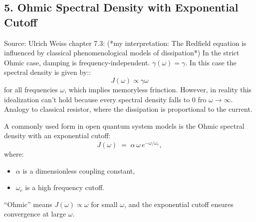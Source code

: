 \subsection*{5. Ohmic Spectral Density with Exponential Cutoff}
Source: Ulrich Weiss chapter 7.3:
(*my interpretation: The Redfield equation is influenced by classical phenomenological models of dissipation*)
In the strict Ohmic case, damping is frequency-independent. $ \gamma(\omega) = \gamma $. 
In this case the spectral density is given by::
\begin{equation}
  J(\omega) \propto \gamma \omega
\end{equation}
for all frequencies $\omega$, which implies memoryless frinction. 
However, in reality this idealization can't hold because every spectral density falls to 0 fro $\omega \to \infty$.
Analogy to classical resistor, where the dissipation is proportional to the current.

\newline
A commonly used form in open quantum system models is the Ohmic spectral density with an exponential cutoff:
\[
J(\omega) \;=\; \alpha \,\omega\, e^{-\omega/\omega_c},
\]
where:
\begin{itemize}
  \item $\alpha$ is a dimensionless coupling constant,
  \item $\omega_c$ is a high frequency cutoff.
\end{itemize}
``Ohmic'' means $J(\omega) \propto \omega$ for small $\omega$, and the exponential cutoff ensures convergence at large $\omega$.